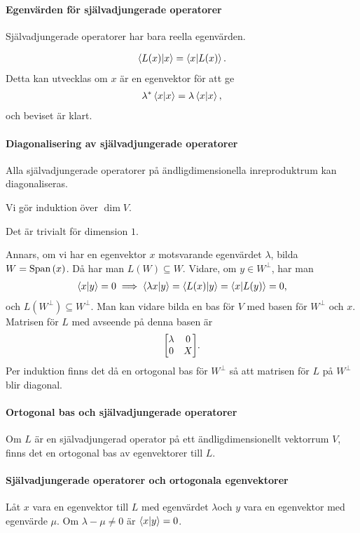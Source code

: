 \paragraph{Egenvärden för självadjungerade operatorer}
Självadjungerade operatorer har bara reella egenvärden.

\proof
\begin{align*}
	\bra{L(x)}\ket{x} = \bra{x}\ket{L(x)}.
\end{align*}
Detta kan utvecklas om $x$ är en egenvektor för att ge
\begin{align*}
	\lambda^{*}\bra{x}\ket{x} = \lambda\bra{x}\ket{x},
\end{align*}
och beviset är klart.

\paragraph{Diagonalisering av självadjungerade operatorer}
Alla självadjungerade operatorer på ändligdimensionella inreproduktrum kan diagonaliseras.

\proof
Vi gör induktion över $\dim{V}$.

Det är trivialt för dimension $1$.

Annars, om vi har en egenvektor $x$ motsvarande egenvärdet $\lambda$, bilda $W = \text{Span}\left(x\right)$. Då har man $L(W)\subseteq W$. Vidare, om $y\in W^{\perp}$, har man
\begin{align*}
	\bra{x}\ket{y} = 0\implies \bra{\lambda x}\ket{y} = \bra{L(x)}\ket{y} = \bra{x}\ket{L(y)} = 0,
\end{align*}
och $L(W^{\perp})\subseteq W^{\perp}$. Man kan vidare bilda en bas för $V$ med basen för $W^{\perp}$ och $x$. Matrisen för $L$ med avseende på denna basen är
\begin{align*}
	\mqty[
		\lambda & 0 \\
		0       & X
	].
\end{align*}
Per induktion finns det då en ortogonal bas för $W^{\perp}$ så att matrisen för $L$ på $W^{\perp}$ blir diagonal.

\paragraph{Ortogonal bas och självadjungerade operatorer}
Om $L$ är en självadjungerad operator på ett ändligdimensionellt vektorrum $V$, finns det en ortogonal bas av egenvektorer till $L$.

\proof

\paragraph{Självadjungerade operatorer och ortogonala egenvektorer}
Låt $x$ vara en egenvektor till $L$ med egenvärdet $\lambda $och $y$ vara en egenvektor med egenvärde $\mu$. Om $\lambda - \mu \neq 0$ är $\bra{x}\ket{y} = 0$.

